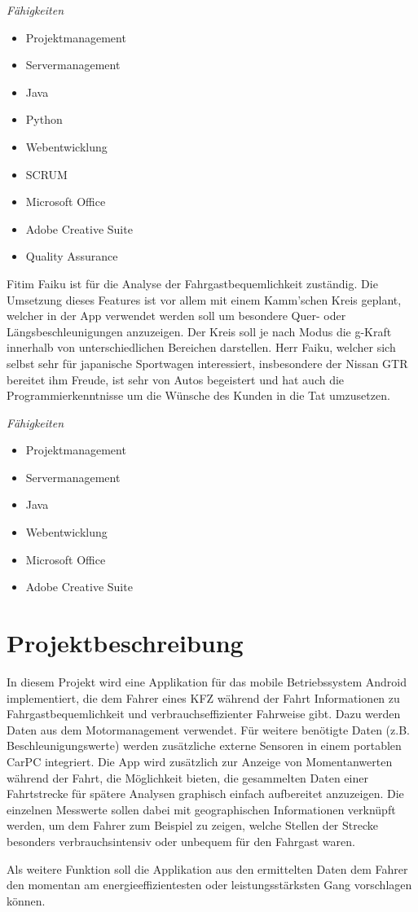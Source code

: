 \textit{Fähigkeiten}
\begin{itemize}
	\item Projektmanagement
	\item Servermanagement				
	\item Java
	\item Python
	\item Webentwicklung
	\item SCRUM
	\item Microsoft Office
	\item Adobe Creative Suite
	\item Quality Assurance
\end{itemize}

Fitim Faiku ist für die Analyse der Fahrgastbequemlichkeit zuständig. Die Umsetzung dieses Features ist vor allem mit einem Kamm'schen Kreis geplant, welcher in der App verwendet werden soll um besondere Quer- oder Längsbeschleunigungen anzuzeigen. Der Kreis soll je nach Modus die g-Kraft innerhalb von unterschiedlichen Bereichen darstellen. 
Herr Faiku, welcher sich selbst sehr für japanische Sportwagen interessiert, insbesondere der Nissan GTR bereitet ihm Freude, ist sehr von Autos begeistert und hat auch die Programmierkenntnisse um die Wünsche des Kunden in die Tat umzusetzen. 

\textit{Fähigkeiten}
\begin{itemize}
	\item Projektmanagement
	\item Servermanagement				
	\item Java
	\item Webentwicklung
	\item Microsoft Office
	\item Adobe Creative Suite
\end{itemize}

\section{Projektbeschreibung}
In diesem Projekt wird eine Applikation für das mobile Betriebssystem Android implementiert, die dem Fahrer eines KFZ während der Fahrt Informationen zu Fahrgastbequemlichkeit und verbrauchseffizienter Fahrweise gibt. Dazu werden Daten aus dem Motormanagement verwendet. Für weitere benötigte Daten (z.B. Beschleunigungswerte) werden zusätzliche externe Sensoren in einem portablen CarPC integriert. Die App wird zusätzlich zur Anzeige von Momentanwerten während der Fahrt, die Möglichkeit bieten, die gesammelten Daten einer Fahrtstrecke für spätere Analysen graphisch einfach aufbereitet anzuzeigen. Die einzelnen Messwerte sollen dabei mit geographischen Informationen verknüpft werden, um dem Fahrer zum Beispiel zu zeigen, welche Stellen der Strecke besonders verbrauchsintensiv oder unbequem für den Fahrgast waren. 

Als weitere Funktion soll die Applikation aus den ermittelten Daten dem Fahrer den momentan am energieeffizientesten oder leistungsstärksten Gang vorschlagen können.
